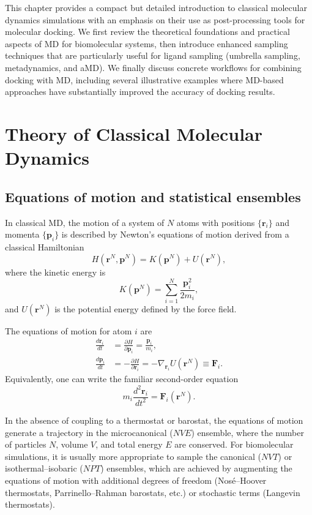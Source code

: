 \documentclass[12pt,a4paper]{article}
\begin{document}
This chapter provides a compact but detailed introduction to classical molecular dynamics simulations with an emphasis on their use as post-processing tools for molecular docking. We first review the theoretical foundations and practical aspects of MD for biomolecular systems, then introduce enhanced sampling techniques that are particularly useful for ligand sampling (umbrella sampling, metadynamics, and aMD). We finally discuss concrete workflows for combining docking with MD, including several illustrative examples where MD-based approaches have substantially improved the accuracy of docking results.

\section{Theory of Classical Molecular Dynamics}

\subsection{Equations of motion and statistical ensembles}

In classical MD, the motion of a system of \(N\) atoms with positions \(\{\mathbf{r}_i\}\) and momenta \(\{\mathbf{p}_i\}\) is described by Newton's equations of motion derived from a classical Hamiltonian
\[
H(\mathbf{r}^N,\mathbf{p}^N) = K(\mathbf{p}^N) + U(\mathbf{r}^N),
\]
where the kinetic energy is
\[
K(\mathbf{p}^N) = \sum_{i=1}^{N} \frac{\mathbf{p}_i^2}{2m_i},
\]
and \(U(\mathbf{r}^N)\) is the potential energy defined by the force field.\cite{FrenkelSmit2002,AllenTildesley1987}

The equations of motion for atom \(i\) are
\begin{align}
\frac{d\mathbf{r}_i}{dt} &= \frac{\partial H}{\partial \mathbf{p}_i} = \frac{\mathbf{p}_i}{m_i}, \\
\frac{d\mathbf{p}_i}{dt} &= -\frac{\partial H}{\partial \mathbf{r}_i} = -\nabla_{\mathbf{r}_i} U(\mathbf{r}^N) \equiv \mathbf{F}_i.
\end{align}
Equivalently, one can write the familiar second-order equation
\[
m_i \frac{d^2 \mathbf{r}_i}{dt^2} = \mathbf{F}_i(\mathbf{r}^N).
\]

In the absence of coupling to a thermostat or barostat, the equations of motion generate a trajectory in the microcanonical (\(NVE\)) ensemble, where the number of particles \(N\), volume \(V\), and total energy \(E\) are conserved. For biomolecular simulations, it is usually more appropriate to sample the canonical (\(NVT\)) or isothermal--isobaric (\(NPT\)) ensembles, which are achieved by augmenting the equations of motion with additional degrees of freedom (Nos\'e--Hoover thermostats, Parrinello--Rahman barostats, etc.) or stochastic terms (Langevin thermostats).\cite{Martyna1992,ParrinelloRahman1981,BussiLangevin2007}
\end{document}
